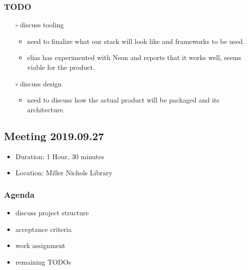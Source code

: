 \documentclass[11pt]{article}
\begin{document}
\subsubsection*{{\bfseries\sffamily TODO} }
\label{sec:org576ca74}
\begin{itemize}
\item[{$\square$}] discuss tooling
\begin{itemize}
\item need to finalize what our stack will look like and frameworks to be
used.
\item elias has experimented with Neon and reports that it works well, seems
viable for the product.
\end{itemize}
\item[{$\square$}] discuss design
\begin{itemize}
\item need to discuss how the actual product will be packaged and its
architecture.
\end{itemize}
\end{itemize}
\subsection{Meeting 2019.09.27}
\label{sec:org0c4e1a7}
\begin{itemize}
\item Duration: 1 Hour, 30 minutes
\item Location: Miller Nichols Library
\end{itemize}
\subsubsection*{Agenda}
\label{sec:org5c27c81}
\begin{itemize}
\item discuss project structure
\item acceptance criteria
\item work assignment
\item remaining TODOs
\end{itemize}
\end{document}

